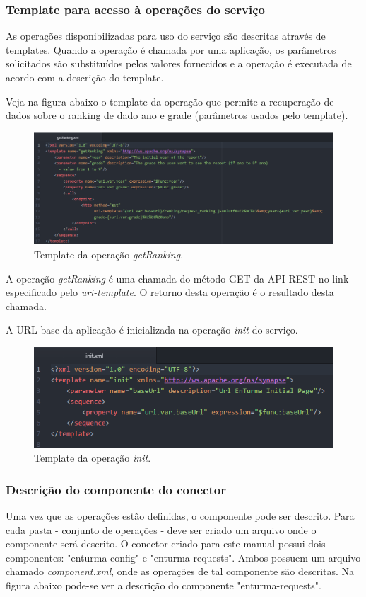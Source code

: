 \subsubsection{Template para acesso à operações do serviço}
As operações disponibilizadas para uso do serviço são descritas através de templates. Quando a operação é chamada por uma aplicação, os parâmetros solicitados são substituídos pelos valores fornecidos e a operação é executada de acordo com a descrição do template.

Veja na figura abaixo o template da operação que permite a recuperação de dados sobre o ranking de dado ano e grade (parâmetros usados pelo template).

\begin{figure}[htb]
\centering
\includegraphics[width=1.0\textwidth]{figuras/operacao_ranking.PNG}
\caption{Template da operação \textit{getRanking}.}
\label{operacao_ranking}
\end{figure}

A operação \textit{getRanking} é uma chamada do método GET da API REST no link especificado pelo \textit{uri-template}. O retorno desta operação é o resultado desta chamada.

A URL base da aplicação é inicializada na operação \textit{init} do serviço.
\begin{figure}[htb]
\centering
\includegraphics[width=1.0\textwidth]{figuras/operacao_init.PNG}
\caption{Template da operação \textit{init}.}
\label{operacao_init}
\end{figure}

\subsubsection{Descrição do componente do conector}
Uma vez que as operações estão definidas, o componente pode ser descrito. Para cada pasta - conjunto de operações - deve ser criado um arquivo onde o componente será descrito. O conector criado para este manual possui dois componentes: "enturma-config" e "enturma-requests". Ambos possuem um arquivo chamado \textit{component.xml}, onde as operações de tal componente são descritas. Na figura abaixo pode-se ver a descrição do componente "enturma-requests".

